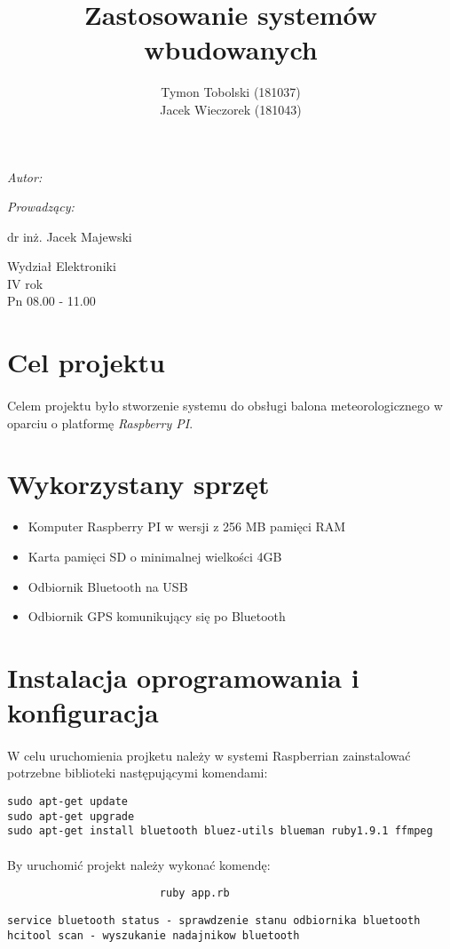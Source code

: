 \documentclass[wide,a4paper,titlepage,12pt]{article}
\title{Zastosowanie systemów wbudowanych}
\author{Tymon Tobolski {\small(181037)}\\ Jacek Wieczorek {\small(181043)}}
\makeatletter
\renewcommand{\maketitle}{
  \begin{titlepage}
    \begin{center}
      \vspace*{3cm}
      \LARGE \@title \par
      \vspace{2cm}
      \textit{\small Autor:}\par
      \normalsize \@author\par \normalsize
      \vspace{3cm}
      \textit{\small Prowadzący:}\par
      dr inż. Jacek Majewski \par
      \vspace{2cm}
      Wydział Elektroniki\\ IV rok\\ Pn 08.00 - 11.00\par

    \end{center}
  \end{titlepage}
}
\makeatother
\begin{document}
\maketitle

\section{Cel projektu} %
\label{sec:cel_projektu}
\paragraph{} %
\label{par:}

Celem projektu było stworzenie systemu do obsługi balona meteorologicznego w oparciu o platformę \textit{Raspberry PI}.
\section{Wykorzystany sprzęt} %
\label{sec:potrzebyn_sprz_t}
\begin{itemize}
  \item Komputer Raspberry PI w wersji z 256 MB pamięci RAM
  \item Karta pamięci SD o minimalnej wielkości 4GB
  \item Odbiornik Bluetooth na USB
  \item Odbiornik GPS komunikujący się po Bluetooth 
\end{itemize}

\section{Instalacja oprogramowania i konfiguracja} %
\label{sec:instalacja_oprogramowania_i_konfiguracja}
\paragraph{} %
\label{par:}
W celu uruchomienia projketu należy w systemi Raspberrian zainstalować potrzebne biblioteki następującymi komendami: 

\begin{lstlisting}
sudo apt-get update
sudo apt-get upgrade
sudo apt-get install bluetooth bluez-utils blueman ruby1.9.1 ffmpeg
\end{lstlisting}

\paragraph{} %
\label{par:}
By uruchomić projekt należy wykonać komendę:

\begin{lstlisting}
                        ruby app.rb
\end{lstlisting}


\begin{lstlisting}
service bluetooth status - sprawdzenie stanu odbiornika bluetooth
hcitool scan - wyszukanie nadajnikow bluetooth
\end{lstlisting}
\end{document}
